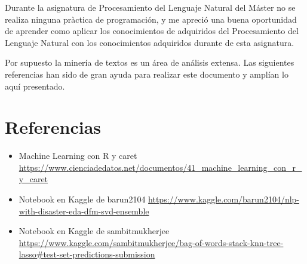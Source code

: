 \documentclass[]{article}
\begin{document}
Durante la asignatura de Procesamiento del Lenguaje Natural del Máster
no se realiza ninguna pràctica de programación, y me apreció una buena
oportunidad de aprender como aplicar los conocimientos de adquiridos del
Procesamiento del Lenguaje Natural con los conocimientos adquiridos
durante de esta asignatura.

Por supuesto la minería de textos es un área de análisis extensa. Las
siguientes referencias han sido de gran ayuda para realizar este
documento y amplían lo aquí presentado.

\hypertarget{referencias}{%
\section{Referencias}\label{referencias}}

\begin{itemize}
\item
  Machine Learning con R y caret
  \url{https://www.cienciadedatos.net/documentos/41_machine_learning_con_r_y_caret}
\item
  Notebook en Kaggle de barun2104
  \url{https://www.kaggle.com/barun2104/nlp-with-disaster-eda-dfm-svd-ensemble}
\item
  Notebook en Kaggle de sambitmukherjee
  \url{https://www.kaggle.com/sambitmukherjee/bag-of-words-stack-knn-tree-lasso\#test-set-predictions-submission}
\end{itemize}
\end{document}
